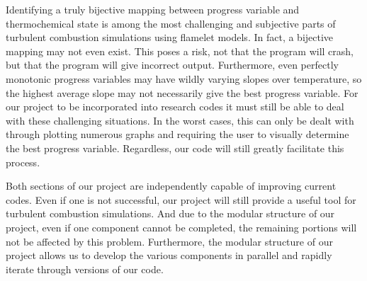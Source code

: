 \documentclass[11pt]{article}
\begin{document}

Identifying a truly bijective mapping between progress variable and
thermochemical state is among the most challenging and subjective
parts of turbulent combustion simulations using flamelet models. In
fact, a bijective mapping may not even exist. This poses a risk, not
that the program will crash, but that the program will give incorrect
output. Furthermore, even perfectly monotonic progress variables may
have wildly varying slopes over temperature, so the highest average
slope may not necessarily give the best progress variable. For our
project to be incorporated into research codes it must still be able
to deal with these challenging situations. In the worst cases, this
can only be dealt with through plotting numerous graphs and requiring
the user to visually determine the best progress variable. Regardless,
our code will still greatly facilitate this process.

Both sections of our project are independently capable of improving
current codes. Even if one is not successful, our project will still
provide a useful tool for turbulent combustion simulations. And due to
the modular structure of our project, even if one component cannot be
completed, the remaining portions will not be affected by this
problem. Furthermore, the modular structure of our project allows us
to develop the various components in parallel and rapidly iterate
through versions of our code.

\end{document}
